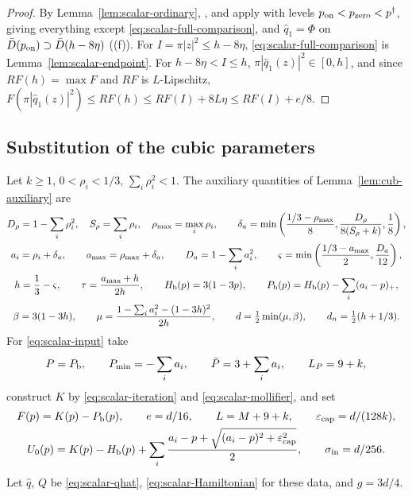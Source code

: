 \begin{proof}
By Lemma~\ref{lem:scalar-ordinary}, ,  and  apply with levels $p_{\rm on}<p_{\rm zero}<p^\dagger$, giving everything except \eqref{eq:scalar-full-comparison}, and $\widehat q_1=\Phi$ on $\bar D(p_{\rm on})\supset\bar D(h-8\eta)$ ((f)). For $I=\pi|z|^2\le h-8\eta$, \eqref{eq:scalar-full-comparison} is Lemma~\ref{lem:scalar-endpoint}. For $h-8\eta<I\le h$, $\pi|\widehat q_1(z)|^2\in[0,h]$, and since $RF(h)=\max F$ and $RF$ is $L$-Lipschitz, $F(\pi|\widehat q_1(z)|^2)\le RF(h)\le RF(I)+8L\eta\le RF(I)+e/8$.
\end{proof}

\subsection{Substitution of the cubic parameters}\label{sec:scalar-cubic}

Let $k\ge1$, $0<\rho_i<1/3$, $\sum_i\rho_i^2<1$. The auxiliary quantities of Lemma~\ref{lem:cub-auxiliary} are
\begin{gather}\label{eq:scalar-cubic-parameters}
 D_\rho=1-\sum_i\rho_i^2,\quad S_\rho=\sum_i\rho_i,\quad \rho_{\max}=\max_i\rho_i,\qquad
 \delta_a=\min\left(\frac{1/3-\rho_{\max}}8,\frac{D_\rho}{8(S_\rho+k)},\frac18\right),\\
 a_i=\rho_i+\delta_a,\qquad a_{\max}=\rho_{\max}+\delta_a,\qquad D_a=1-\sum_ia_i^2,\qquad
 \varsigma=\min\left(\frac{1/3-a_{\max}}2,\frac{D_a}{12}\right),\notag\\
 h=\frac13-\varsigma,\qquad \tau=\frac{a_{\max}+h}{2h},\qquad
 H_{\mathrm b}(p)=3(1-3p),\qquad P_{\mathrm b}(p)=H_{\mathrm b}(p)-\sum_i(a_i-p)_+,\notag\\
 \beta=3(1-3h),\qquad \mu=\frac{1-\sum_ia_i^2-(1-3h)^2}{2h},\qquad
 d=\tfrac12\min(\mu,\beta),\qquad d_n=\tfrac12(h+1/3).\notag
\end{gather}
For \eqref{eq:scalar-input} take
\begin{equation}\label{eq:scalar-cubic-input}
 P=P_{\mathrm b},\qquad P_{\min}=-\sum_i a_i,\qquad \bar P=3+\sum_i a_i,\qquad L_P=9+k,
\end{equation}
construct $K$ by \eqref{eq:scalar-iteration} and \eqref{eq:scalar-mollifier}, and set
\begin{gather}\label{eq:scalar-cubic-planar}
 F(p)=K(p)-P_{\mathrm b}(p),\qquad e=d/16,\qquad L=M+9+k,\qquad \varepsilon_{\rm cap}=d/(128k),\\
 U_0(p)=K(p)-H_{\mathrm b}(p)+\sum_i\frac{a_i-p+\sqrt{(a_i-p)^2+\varepsilon_{\rm cap}^2}}2,
 \qquad \sigma_{\rm in}=d/256.\notag
\end{gather}
Let $\widehat q$, $Q$ be \eqref{eq:scalar-qhat}, \eqref{eq:scalar-Hamiltonian} for these data, and $g=3d/4$.

